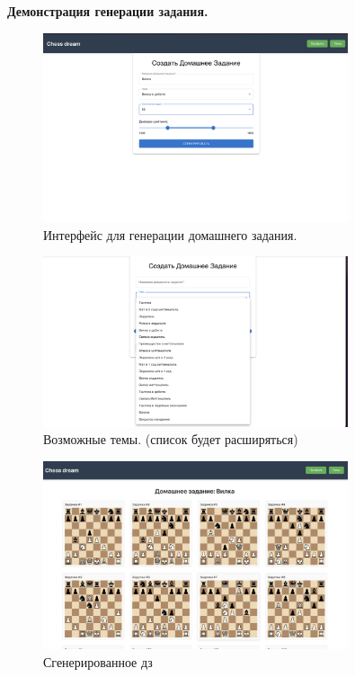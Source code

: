 \documentclass[a4paper,12pt]{article}
\begin{document}
\vspace{0.5cm}
\noindent
\textbf{Демонстрация генерации задания.}
\begin{center}
    \begin{figure}[htbp]
    \includegraphics[width=0.8\textwidth]{chessdreampics/homeworkGen.png}
    \caption{Интерфейс для генерации домашнего задания.}
    \end{figure}
\end{center}
\begin{center}
    \begin{figure}[htbp]
    \includegraphics[width=0.8\textwidth]{chessdreampics/themes.png}
    \caption{Возможные темы. (список будет расширяться)}
    \end{figure}
\end{center}
\begin{center}
    \begin{figure}[htbp]
    \includegraphics[width=0.8\textwidth]{chessdreampics/homework.png}
    \caption{Сгенерированное дз}
    \end{figure}

\end{center}
\vspace{0.5cm}
\end{document}
